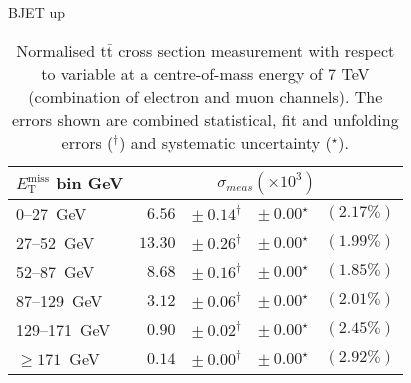 \documentclass{article}
\newcommand{\ttbar}{\ensuremath{\text{t}\bar{\text{t}}}\xspace}
\newcommand{\GeV}{GeV}
\begin{document}
BJET up
\begin{table}[H]
\setlength{\tabcolsep}{2pt}
\centering
\caption{Normalised \ttbar cross section measurement with respect to \MET variable
at a centre-of-mass energy of 7 TeV (combination of electron and muon channels). The errors shown are combined statistical, fit and unfolding errors ($^\dagger$) and systematic uncertainty ($^\star$).}
\label{tab:MET_xsections_7TeV_BJet_up_combined}
\begin{tabular}{lrrrr}
\hline
$E_{\mathrm{T}}^{\mathrm{miss}}$ bin GeV & \multicolumn{4}{c}{$\sigma_{meas} \left(\times 10^{3}\right)$}\\ 
\hline
0--27~\GeV &  $6.56$ & $ \pm~ 0.14^\dagger$ & $ \pm~ 0.00^\star$ & $(2.17\%)$\\ 
27--52~\GeV &  $13.30$ & $ \pm~ 0.26^\dagger$ & $ \pm~ 0.00^\star$ & $(1.99\%)$\\ 
52--87~\GeV &  $8.68$ & $ \pm~ 0.16^\dagger$ & $ \pm~ 0.00^\star$ & $(1.85\%)$\\ 
87--129~\GeV &  $3.12$ & $ \pm~ 0.06^\dagger$ & $ \pm~ 0.00^\star$ & $(2.01\%)$\\ 
129--171~\GeV &  $0.90$ & $ \pm~ 0.02^\dagger$ & $ \pm~ 0.00^\star$ & $(2.45\%)$\\ 
$\geq 171$~\GeV &  $0.14$ & $ \pm~ 0.00^\dagger$ & $ \pm~ 0.00^\star$ & $(2.92\%)$\\ 
\hline 
\end{tabular}
\end{table}
\end{document}
